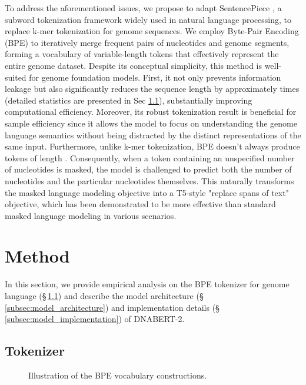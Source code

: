 \documentclass{article}
\begin{document}
To address the aforementioned issues, we propose to adapt SentencePiece \citep{sentencepiece}, a subword tokenization framework widely used in natural language processing, to replace k-mer tokenization for genome sequences. We employ Byte-Pair Encoding (BPE) \citep{bpe} to iteratively merge frequent pairs of nucleotides and genome segments, forming a vocabulary of variable-length tokens that effectively represent the entire genome dataset. 
Despite its conceptual simplicity, this method is well-suited for genome foundation models.
First, it not only prevents information leakage but also significantly reduces the sequence length by approximately  times (detailed statistics are presented in Sec \ref{subsec:model_tokenization}), substantially improving computational efficiency. 
Moreover, its robust tokenization result is beneficial for sample efficiency since it allows the model to focus on understanding the genome language semantics without being distracted by the distinct representations of the same input.
Furthermore, unlike k-mer tokenization, BPE doesn't always produce tokens of length . Consequently, when a token containing an unspecified number of nucleotides is masked, the model is challenged to predict both the number of nucleotides and the particular nucleotides themselves. This naturally transforms the masked language modeling objective into a T5-style \citep{t5} "replace spans of text" objective, which has been demonstrated to be more effective than standard masked language modeling in various scenarios.






\section{Method}
\label{sec:model}

In this section, we provide empirical analysis on the BPE tokenizer for genome language (\S\,\ref{subsec:model_tokenization}) and describe the model architecture (\S\,\ref{subsec:model_architecture}) and implementation details (\S\,\ref{subsec:model_implementation}) of DNABERT-2.

\subsection{Tokenizer}
\label{subsec:model_tokenization}

\begin{wrapfigure}{l}{0.5\textwidth}
    \centering
    \caption{Illustration of the BPE vocabulary constructions.}
    \label{fig:bpe}
\end{wrapfigure}
\end{document}
